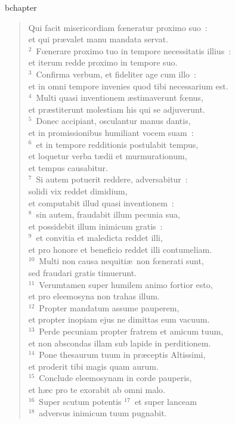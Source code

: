 bchapter\begin{verse}\vspace{-19pt}Qui facit misericordiam fœneratur proximo suo~:\\ et qui pr\ae valet manu mandata servat.\\
${}^{2}$~Fœnerare proximo tuo in tempore necessitatis illius~:\\ et iterum redde proximo in tempore suo.\\
${}^{3}$~Confirma verbum, et fideliter age cum illo~:\\ et in omni tempore invenies quod tibi necessarium est.\\
${}^{4}$~Multi quasi inventionem \ae stimaverunt fœnus,\\ et pr\ae stiterunt molestiam his qui se adjuverunt.\\
${}^{5}$~Donec accipiant, osculantur manus dantis,\\ et in promissionibus humiliant vocem suam~:\\
${}^{6}$~et in tempore redditionis postulabit tempus,\\ et loquetur verba t\ae dii et murmurationum,\\ et tempus causabitur.\\
${}^{7}$~Si autem potuerit reddere, adversabitur~:\\ solidi vix reddet dimidium,\\ et computabit illud quasi inventionem~:\\
${}^{8}$~sin autem, fraudabit illum pecunia sua,\\ et possidebit illum inimicum gratis~:\\
${}^{9}$~et convitia et maledicta reddet illi,\\ et pro honore et beneficio reddet illi contumeliam.\\
${}^{10}$~Multi non causa nequiti\ae\ non fœnerati sunt,\\ sed fraudari gratis timuerunt.\\
${}^{11}$~Verumtamen super humilem animo fortior esto,\\ et pro eleemosyna non trahas illum.\\
${}^{12}$~Propter mandatum assume pauperem,\\ et propter inopiam ejus ne dimittas eum vacuum.\\
${}^{13}$~Perde pecuniam propter fratrem et amicum tuum,\\ et non abscondas illam sub lapide in perditionem.\\
${}^{14}$~Pone thesaurum tuum in pr\ae ceptis Altissimi,\\ et proderit tibi magis quam aurum.\\
${}^{15}$~Conclude eleemosynam in corde pauperis,\\ et h\ae c pro te exorabit ab omni malo.\\
${}^{16}$~Super scutum potentis
${}^{17}$~et super lanceam\\
${}^{18}$~adversus inimicum tuum pugnabit.\end{verse}



